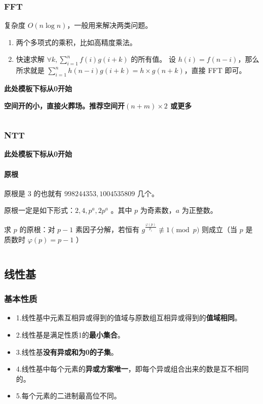 \documentclass[a4paper,11pt]{article}
\begin{document}
\subsubsection{FFT}
\leavevmode

复杂度 \(O(n\log n)\)，一般用来解决两类问题。
\begin{enumerate}
  \item 两个多项式的乘积，比如高精度乘法。
  \item 快速求解 $\forall k,\sum\limits_{i=1}^{n}{f(i)g(i+k)}$ 的所有值。
  设 $h(i)=f(n-i)$，那么所求就是 $\sum\limits_{i=1}^{n}{h(n-i)g(i+k)}=h\times g(n+k)$，直接 FFT 即可。
\end{enumerate}

\textbf{此处模板下标从0开始}

\textbf{空间开的小，直接火葬场。推荐空间开\((n+m)\times 2\) 或更多}
\inputminted[linenos]{c++}{math/FFT.cpp}
\subsubsection{NTT}
\textbf{此处模板下标从0开始}
\paragraph{原根}
原根是 \(3\) 的也就有 \(998244353,1004535809\) 几个。

\noindent 原根一定是如下形式：\(2,4,p^a,2p^a\) 。其中 \(p\) 为奇素数，\(a\)
为正整数。

求 \(p\) 的原根：对 \(p-1\) 素因子分解，若恒有
\(g^{\frac{\varphi(p)}{p_i}}\not\equiv 1\pmod p\) 则成立（当 \(p\)
是质数时 \(\varphi(p)=p-1\) ）

\inputminted[linenos]{c++}{math/NTT.cpp}
\subsection{线性基}
\subsubsection{基本性质}
\begin{itemize}
\item
  1.线性基中元素互相异或得到的值域与原数组互相异或得到的\textbf{值域相同}。
\item
  2.线性基是满足性质1的\textbf{最小集合}。
\item
  3.线性基\textbf{没有异或和为0的子集}。
\item
  4.线性基中每个元素的\textbf{异或方案唯一}，即每个异或组合出来的数是互不相同的。
\item
  5.每个元素的二进制最高位不同。
\end{itemize}
\inputminted[linenos]{c++}{math/xianxingji.cpp}
\end{document}
